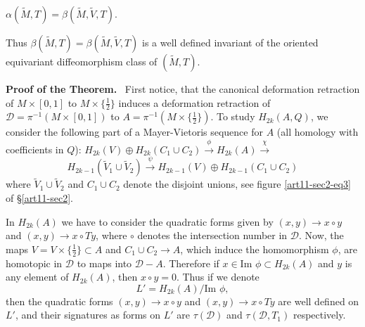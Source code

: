 \begin{theorem*}
$\alpha(\widetilde{M},T)=\beta(\widetilde{M},\widetilde{V},T)$.

Thus $\beta(\widetilde{M},T)=\beta(\widetilde{M},\widetilde{V},T)$ is a well defined invariant of the oriented equivariant diffeomorphism class of $(\widetilde{M},T)$.
\end{theorem*}

\noindent
{\bf Proof of the Theorem.}~ First notice, that the canonical deformation retraction of $M\times [0,1]$ to $M\times \{\frac{1}{2}\}$ induces a deformation retraction of $\mathscr{D}=\pi^{-1}(M\times [0,1])$ to $A=\pi^{-1}(M\times \{\frac{1}{2}\})$. To study $H_{2k}(A,Q)$, we consider the following part of a Mayer-Vietoris sequence for $A$ (all homology with coefficients in $Q$): $H_{2k}(V)\oplus H_{2k}(C_{1}\cup C_{2})\xrightarrow{\phi}H_{2k}(A)\xrightarrow{\chi}$\pageoriginale
$$
H_{2k-1}(\widetilde{V}_{1}\cup \widetilde{V}_{2})\xrightarrow{\psi}H_{2k-1}(V)\oplus H_{2k-1}(C_{1}\cup C_{2})
$$
where $\widetilde{V}_{1}\cup \widetilde{V}_{2}$ and $C_{1}\cup C_{2}$ denote the disjoint unions, see figure \eqref{art11-sec2-eq3} of \S\ref{art11-sec2}.

In $H_{2k}(A)$ we have to consider the quadratic forms given by $(x,y)\to x\circ y$ and $(x,y)\to x\circ Ty$, where $\circ$ denotes the intersection number in $\mathscr{D}$. Now, the maps $V=V\times \{\frac{1}{2}\}\subset A$ and $C_{1}\cup C_{2}\to A$, which induce the homomorphism $\phi$, are homotopic in $\mathscr{D}$ to maps into $\mathscr{D}-A$. Therefore if $x\in \text{Im~}\phi\subset H_{2k}(A)$ and $y$ is any element of $H_{2k}(A)$, then $x\circ y=0$. Thus if we denote
\begin{equation}
L'=H_{2k}(A)/\text{Im~}\phi,\label{art11-sec3-eq2}
\end{equation}
then the quadratic forms $(x,y)\to x\circ y$ and $(x,y)\to x\circ Ty$ are well defined on $L'$, and their signatures as forms on $L'$ are $\tau(\mathscr{D})$ and $\tau(\mathscr{D},T_{1})$ respectively.

